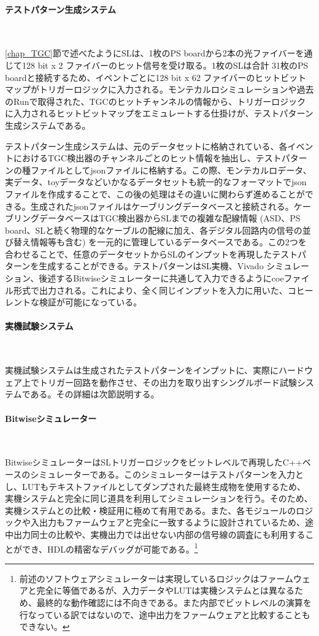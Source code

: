 \paragraph{テストパターン生成システム}　　
\par
\ref{chap_TGC}節で述べたようにSLは、1枚のPS boardから2本の光ファイバーを通じて128 bit x 2 ファイバーのヒット信号を受け取る。1枚のSLは合計 31枚のPS boardと接続するため、イベントごとに128 bit x 62 ファイバーのヒットビットマップがトリガーロジックに入力される。モンテカルロシミュレーションや過去のRunで取得された、TGCのヒットチャンネルの情報から、トリガーロジックに入力されるヒットビットマップをエミュレートする仕掛けが、テストパターン生成システムである。

テストパターン生成システムは、元のデータセットに格納されている、各イベントにおけるTGC検出器のチャンネルごとのヒット情報を抽出し、テストパターンの種ファイルとしてjsonファイルに格納する。この際、モンテカルロデータ、実データ、toyデータなどいかなるデータセットも統一的なフォーマットでjsonファイルを作成することで、この後の処理はその違いに関わらず進めることができる。生成されたjsonファイルはケーブリングデータベースと接続される。ケーブリングデータベースはTGC検出器からSLまでの複雑な配線情報 (ASD、PS board、SLと続く物理的なケーブルの配線に加え、各デジタル回路内の信号の並び替え情報等も含む) を一元的に管理しているデータベースである。この2つを合わせることで、任意のデータセットからSLのインプットを再現したテストパターンを生成することができる。テストパターンはSL実機、Vivado シミュレーション、後述するBitwiseシミュレーターに共通して入力できるようにcoeファイル形式で出力される。これにより、全く同じインプットを入力に用いた、コヒーレントな検証が可能になっている。

\paragraph{実機試験システム}　　
\par
実機試験システムは生成されたテストパターンをインプットに、実際にハードウェア上でトリガー回路を動作させ、その出力を取り出すシングルボード試験システムである。その詳細は次節説明する。

\paragraph{Bitwiseシミュレーター}　　
\par
BitwiseシミュレーターはSLトリガーロジックをビットレベルで再現したC++ベースのシミュレーターである。このシミュレーターはテストパターンを入力とし、LUTもテキストファイルとしてダンプされた最終生成物を使用するため、実機システムと完全に同じ道具を利用してシミュレーションを行う。そのため、実機システムとの比較・検証用に極めて有用である。また、各モジュールのロジックや入出力もファームウェアと完全に一致するように設計されているため、途中出力同士の比較や、実機出力では出せない内部の信号線の調査にも利用することができ、HDLの精密なデバッグが可能である。\footnote{前述のソフトウェアシミュレーターは実現しているロジックはファームウェアと完全に等価であるが、入力データやLUTは実機システムとは異なるため、最終的な動作確認には不向きである。また内部でビットレベルの演算を行なっている訳ではないので、途中出力をファームウェアと比較することもできない。}

